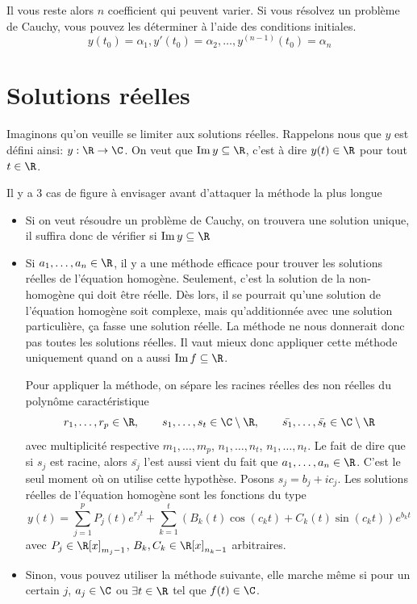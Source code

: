 Il vous reste alors $n$ coefficient qui peuvent varier.
Si vous résolvez un problème de Cauchy, vous pouvez les déterminer à l'aide des conditions initiales.
\[ y(t_0) = \alpha_1, y'(t_0) = \alpha_2, \dots , y^{(n-1)}(t_0) = \alpha_n \]

\section{Solutions réelles}
Imaginons qu'on veuille se limiter aux solutions réelles.  Rappelons nous que $y$ est défini ainsi: $y: \R \to \C$.
On veut que $\newim y \subseteq \R$, c'est à dire $y(t) \in \R$ pour tout $t \in \R$.

Il y a 3 cas de figure à envisager avant d'attaquer la méthode la plus longue
\begin{itemize}
	\item Si on veut résoudre un problème de Cauchy, on trouvera une solution unique,
		il suffira donc de vérifier si $\newim y \subseteq \R$
	\item Si $a_1, \dots, a_n \in \R$,
		il y a une méthode efficace pour trouver les solutions réelles de l'équation homogène.
		Seulement, c'est la solution de la non-homogène qui doit être réelle.
		Dès lors, il se pourrait qu'une solution de l'équation homogène soit complexe,
		mais qu'additionnée avec une solution particulière, ça fasse une solution réelle.
		La méthode ne nous donnerait donc pas toutes les solutions réelles.
		Il vaut mieux donc appliquer cette méthode uniquement quand on a aussi $\newim f \subseteq \R$.

		Pour appliquer la méthode, on sépare les racines réelles des non réelles du polynôme caractéristique
		\[ r_1, \dots, r_p \in \R, \qquad s_1, \dots, s_t \in \C \setminus \R, \qquad
		\bar{s_1}, \dots, \bar{s_t} \in \C \setminus \R \]
		avec multiplicité respective $m_1, \dots, m_p$, $n_1, \dots, n_t$, $n_1, \dots, n_t$.
		Le fait de dire que si $s_j$ est racine, alors $\bar{s_j}$ l'est aussi vient du fait que $a_1, \dots, a_n \in \R$.
		C'est le seul moment où on utilise cette hypothèse.
		Posons $s_j = b_j + ic_j$.
		Les solutions réelles de l'équation homogène sont les fonctions du type
		\[ y(t) = \sum_{j = 1}^p P_j(t)e^{r_jt} + \sum_{k=1}^t(B_k(t)\cos(c_kt)+C_k(t)\sin(c_kt))e^{b_kt} \]
		avec $P_j \in \R[x]_{m_j-1}$, $B_k, C_k \in \R[x]_{n_k-1}$ arbitraires.
	\item Sinon, vous pouvez utiliser la méthode suivante,
		elle marche même si pour un certain $j$, $a_j \in \C$ ou $\exists t \in \R$ tel que $f(t) \in \C$.


\end{itemize}
